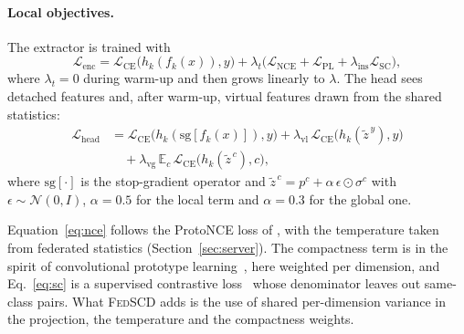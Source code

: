 \paragraph{Local objectives.}
The extractor is trained with
\begin{equation}
  \mathcal{L}_{\mathrm{enc}}=\mathcal{L}_{\mathrm{CE}}\big(h_k(f_k(x)),y\big)+\lambda_t\big(\mathcal{L}_{\mathrm{NCE}}+\mathcal{L}_{\mathrm{PL}}+\lambda_{\mathrm{ins}}\mathcal{L}_{\mathrm{SC}}\big),
  \label{eq:enc}
\end{equation}
where $\lambda_t=0$ during warm-up and then grows linearly to $\lambda$. The head sees detached features and, after warm-up, virtual features drawn from the shared statistics:
\begin{equation}
\begin{aligned}
  \mathcal{L}_{\mathrm{head}}&=\mathcal{L}_{\mathrm{CE}}\big(h_k(\mathrm{sg}[f_k(x)]),y\big)
  +\lambda_{\mathrm{vl}}\,\mathcal{L}_{\mathrm{CE}}\big(h_k(\tilde z^{\,y}),y\big)\\
  &\quad+\lambda_{\mathrm{vg}}\,\mathbb{E}_c\,\mathcal{L}_{\mathrm{CE}}\big(h_k(\tilde z^{\,c}),c\big),
\end{aligned}
\label{eq:head}
\end{equation}
where $\mathrm{sg}[\cdot]$ is the stop-gradient operator and $\tilde z^{\,c}=p^c+\alpha\,\epsilon\odot\sigma^c$ with $\epsilon\sim\mathcal{N}(0,I)$, $\alpha=0.5$ for the local term and $\alpha=0.3$ for the global one.

\begin{remark}
Equation~\ref{eq:nce} follows the ProtoNCE loss of \citet{li2021prototypical}, with the temperature taken from federated statistics (Section~\ref{sec:server}). The compactness term is in the spirit of convolutional prototype learning~\citep{yang2018cpl}, here weighted per dimension, and Eq.~\ref{eq:sc} is a supervised contrastive loss~\citep{khosla2020supervised} whose denominator leaves out same-class pairs. What \textsc{FedSCD} adds is the use of shared per-dimension variance in the projection, the temperature and the compactness weights.
\end{remark}
 
